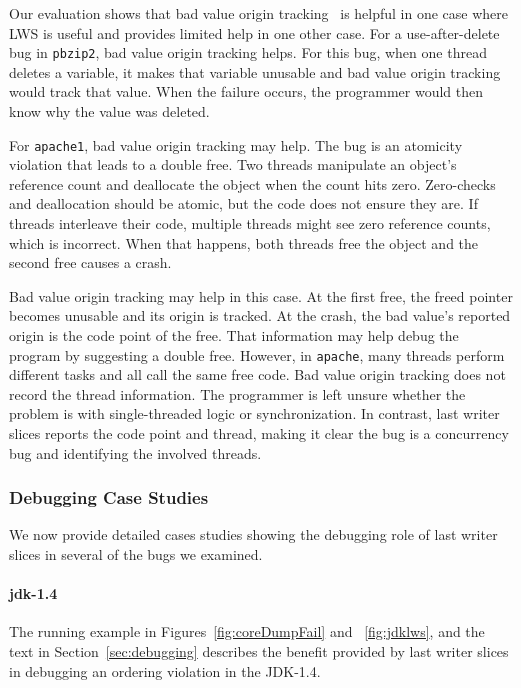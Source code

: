 \documentclass[10pt,nocopyrightspace]{sigplanconf}
\newcommand{\lws}{LWS\xspace}
\begin{document}
Our evaluation shows that bad value origin tracking~\cite{badapples} is
helpful in one case where \lws is useful and provides limited help
in one other case.  For a use-after-delete bug in {\tt pbzip2}, bad value
origin tracking helps.  For this bug, when one thread deletes a variable, it
makes that variable unusable and bad value origin tracking would track that
value.  When the failure occurs, the programmer would then know why the value
was deleted.  

For {\tt apache1}, bad value origin tracking may help.  The bug is an atomicity
violation that leads to a double free.  Two threads manipulate an object's
reference count and deallocate the object when the count hits zero. Zero-checks
and deallocation should be atomic, but the code does not ensure they are.  If
threads interleave their code, multiple threads might see zero reference
counts, which is incorrect.  When that happens, both threads free the
object and the second free causes a crash.  

Bad value origin tracking may help in this case.  At the first free, the freed
pointer becomes unusable and its origin is tracked.  At the crash, the bad
value's reported origin is the code point of the free. That information may
help debug the program by suggesting a double free.  However, in {\tt apache},
many threads perform different tasks and all call the same free code.  Bad
value origin tracking does not record the thread information.  The programmer
is left unsure whether the problem is with single-threaded logic or
synchronization.  In contrast, last writer slices reports the code point and
thread, making it clear the bug is a concurrency bug and identifying the
involved threads.

\subsubsection{Debugging Case Studies}
\label{sec:eval:debugging:cases}

We now provide detailed cases studies showing the debugging role of last writer
slices in several of the bugs we examined.  



\paragraph{jdk-1.4}
The running example in Figures~\ref{fig:coreDumpFail} and ~\ref{fig:jdklws},
and the text in Section~\ref{sec:debugging} describes the benefit provided by
last writer slices in debugging an ordering violation in the JDK-1.4.
\end{document}
